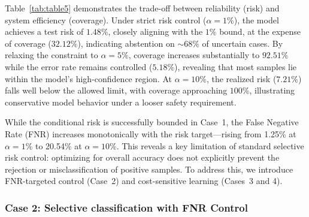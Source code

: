 \documentclass[journal,twoside,web]{ieeecolor}
\begin{document}
Table~\ref{tab:table5} demonstrates the trade-off between reliability (risk) and system efficiency (coverage). Under strict risk control ($\alpha=1\%$), the model achieves a test risk of $1.48\%$, closely aligning with the $1\%$ bound, at the expense of coverage ($32.12\%$), indicating abstention on ${\sim}68\%$ of uncertain cases. By relaxing the constraint to $\alpha=5\%$, coverage increases substantially to $92.51\%$ while the error rate remains controlled ($5.18\%$), revealing that most samples lie within the model’s high-confidence region. At $\alpha=10\%$, the realized risk ($7.21\%$) falls well below the allowed limit, with coverage approaching $100\%$, illustrating conservative model behavior under a looser safety requirement.

\begin{table}[htbp]
    \centering
    \caption{The selective classification performance of Case 1.}
    \label{tab:table5}
\end{table}

While the conditional risk is successfully bounded in Case~1, the False Negative Rate (FNR) increases monotonically with the risk target—rising from 1.25\% at $\alpha=1\%$ to 20.54\% at $\alpha=10\%$. This reveals a key limitation of standard selective risk control: optimizing for overall accuracy does not explicitly prevent the rejection or misclassification of positive samples. To address this, we introduce FNR-targeted control (Case~2) and cost-sensitive learning (Cases~3 and 4).

\subsubsection{\textbf{Case 2: Selective classification with FNR Control}}
\label{sec:case2_results}
\end{document}
